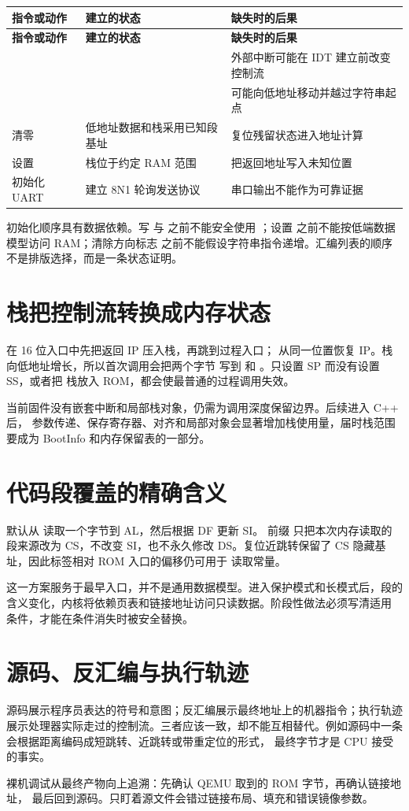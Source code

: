 \begin{longtable}{L{0.20\textwidth}L{0.28\textwidth}L{0.36\textwidth}}
\toprule
\textbf{指令或动作} & \textbf{建立的状态} & \textbf{缺失时的后果}\\
\midrule
\endfirsthead
\toprule
\textbf{指令或动作} & \textbf{建立的状态} & \textbf{缺失时的后果}\\
\midrule
\endhead
{} &  & 外部中断可能在 IDT 建立前改变控制流\\
 &  &  可能向低地址移动并越过字符串起点\\
清零  & 低地址数据和栈采用已知段基址 & 复位残留状态进入地址计算\\
设置  & 栈位于约定 RAM 范围 &  把返回地址写入未知位置\\
初始化 UART & 建立 8N1 轮询发送协议 & 串口输出不能作为可靠证据\\
\bottomrule
\end{longtable}

初始化顺序具有数据依赖。写  与  之前不能安全使用
；设置  之前不能按低端数据模型访问 RAM；清除方向标志
之前不能假设字符串指令递增。汇编列表的顺序不是排版选择，而是一条状态证明。

\section{栈把控制流转换成内存状态}

 在 16 位入口中先把返回 IP 压入栈，再跳到过程入口；
 从同一位置恢复 IP。栈向低地址增长，所以首次调用会把两个字节
写到  和 。只设置 SP 而没有设置 SS，或者把
栈放入 ROM，都会使最普通的过程调用失效。

当前固件没有嵌套中断和局部栈对象，仍需为调用深度保留边界。后续进入 C++ 后，
参数传递、保存寄存器、对齐和局部对象会显著增加栈使用量，届时栈范围要成为
BootInfo 和内存保留表的一部分。

\section{代码段覆盖的精确含义}

 默认从  读取一个字节到 AL，然后根据 DF 更新 SI。
前缀  只把本次内存读取的段来源改为 CS，不改变 SI，也不永久修改
DS。复位近跳转保留了 CS 隐藏基址，因此标签相对 ROM 入口的偏移仍可用于
读取常量。

这一方案服务于最早入口，并不是通用数据模型。进入保护模式和长模式后，段的
含义变化，内核将依赖页表和链接地址访问只读数据。阶段性做法必须写清适用
条件，才能在条件消失时被安全替换。

\section{源码、反汇编与执行轨迹}

源码展示程序员表达的符号和意图；反汇编展示最终地址上的机器指令；执行轨迹
展示处理器实际走过的控制流。三者应该一致，却不能互相替代。例如源码中一条
 会根据距离编码成短跳转、近跳转或带重定位的形式，
最终字节才是 CPU 接受的事实。

\begin{keyidea}
裸机调试从最终产物向上追溯：先确认 QEMU 取到的 ROM 字节，再确认链接地址，
最后回到源码。只盯着源文件会错过链接布局、填充和错误镜像参数。
\end{keyidea}
